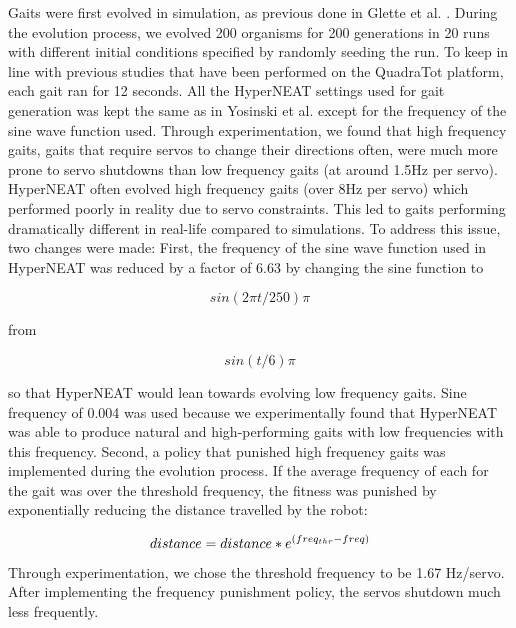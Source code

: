 Gaits were first evolved in simulation, as previous done in Glette et al. \cite{glette}. 
During the evolution process, we evolved 200 organisms for 200 generations in 20 runs with different initial conditions specified by randomly seeding the run. 
To keep in line with previous studies that have been performed on the QuadraTot platform, each gait ran for 12 seconds. 
All the HyperNEAT settings used for gait generation was kept the same as in Yosinski et al. \cite{yos:clune} except for the frequency of the sine wave function used. 
Through experimentation, we found that high frequency gaits, gaits that require servos to change their directions often, were much more prone to servo shutdowns than low frequency gaits (at around 1.5Hz per servo). 
HyperNEAT often evolved high frequency gaits (over 8Hz per servo) which performed poorly in reality due to servo constraints. 
This led to gaits performing dramatically different in real-life compared to simulations. 
To address this issue, two changes were made:
First, the frequency of the sine wave function used in HyperNEAT was reduced by a factor of 6.63 by changing the sine function to

\begin{equation}
sin(2\pi t/250)\pi
\end{equation}

from

\begin{equation}
sin(t/6)\pi
\end{equation}


so that HyperNEAT would lean towards evolving low frequency gaits. Sine frequency of 0.004  was used because we experimentally found that HyperNEAT was able to produce natural and high-performing gaits with low frequencies with this frequency. 
Second, a policy that punished high frequency gaits was implemented during the evolution process. 
If the average frequency of each for the gait was over the threshold frequency, the fitness was punished by exponentially reducing the distance travelled by the robot:

\begin{equation}
distance = distance*e^{(freq_{thr}-freq)} \\
\end{equation}

Through experimentation, we chose the threshold frequency to be 1.67 Hz/servo. After implementing the frequency punishment policy, the servos shutdown much less frequently. 


